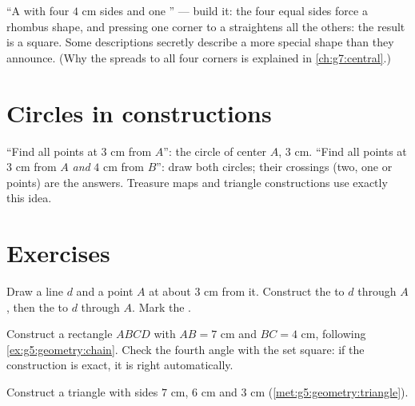 \begin{example}\label{ex:g5:geometry:recognize}
``A  with four $4$ cm sides and one '' ---
build it: the four equal sides force a rhombus shape, and pressing
one corner to a  straightens all the others: the result
is a square. Some descriptions secretly describe a more special
shape than they announce. (Why the  spreads to all four
corners is explained in \cref{ch:g7:central}.)
\end{example}

\section{Circles in constructions}

\begin{example}\label{ex:g5:geometry:circle}
``Find all points at $3$ cm from $A$'': the circle of center $A$,
 $3$ cm. ``Find all points at $3$ cm from $A$ \emph{and}
$4$ cm from $B$'': draw both circles; their crossings (two, one or
 points) are the answers. Treasure maps and triangle
constructions use exactly this idea.
\end{example}

\section{Exercises}

\begin{exercise}[$\star$]\label{exo:g5:geometry:1}
Draw a line $d$ and a point $A$ at about $3$ cm from it. Construct
the  to $d$ through $A$, then the  to $d$
through $A$. Mark the .
\end{exercise}

\begin{exercise}[$\star$]\label{exo:g5:geometry:2}
Construct a rectangle $ABCD$ with $AB = 7$ cm and $BC = 4$ cm,
following \cref{ex:g5:geometry:chain}. Check the fourth angle with
the set square: if the construction is exact, it is right
automatically.
\end{exercise}

\begin{exercise}[$\star$]\label{exo:g5:geometry:3}
Construct a triangle with sides $7$ cm, $6$ cm and $3$ cm
(\cref{met:g5:geometry:triangle}).
\end{exercise}

